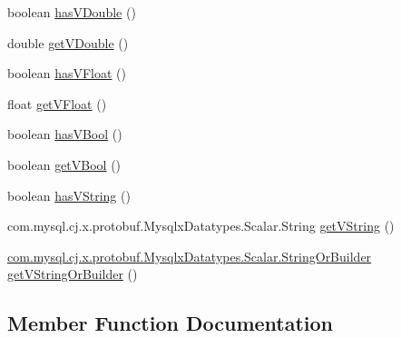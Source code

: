 \begin{DoxyCompactItemize}
\item 
boolean \mbox{\hyperlink{interfacecom_1_1mysql_1_1cj_1_1x_1_1protobuf_1_1_mysqlx_datatypes_1_1_scalar_or_builder_a7bc12f50111b5c67b28bb53db4e1cc15}{has\+V\+Double}} ()
\item 
double \mbox{\hyperlink{interfacecom_1_1mysql_1_1cj_1_1x_1_1protobuf_1_1_mysqlx_datatypes_1_1_scalar_or_builder_abaf6d23ac57106345f809ca86c0ccc55}{get\+V\+Double}} ()
\item 
boolean \mbox{\hyperlink{interfacecom_1_1mysql_1_1cj_1_1x_1_1protobuf_1_1_mysqlx_datatypes_1_1_scalar_or_builder_a95c66f16de5f11832c452efe8162591b}{has\+V\+Float}} ()
\item 
float \mbox{\hyperlink{interfacecom_1_1mysql_1_1cj_1_1x_1_1protobuf_1_1_mysqlx_datatypes_1_1_scalar_or_builder_afa2e969d3b29289e6835794188eb5c87}{get\+V\+Float}} ()
\item 
boolean \mbox{\hyperlink{interfacecom_1_1mysql_1_1cj_1_1x_1_1protobuf_1_1_mysqlx_datatypes_1_1_scalar_or_builder_afb5ea784ea895145c0f698c4d542f2d8}{has\+V\+Bool}} ()
\item 
boolean \mbox{\hyperlink{interfacecom_1_1mysql_1_1cj_1_1x_1_1protobuf_1_1_mysqlx_datatypes_1_1_scalar_or_builder_ae324b8314100f315a7d9f8ee015b33e9}{get\+V\+Bool}} ()
\item 
boolean \mbox{\hyperlink{interfacecom_1_1mysql_1_1cj_1_1x_1_1protobuf_1_1_mysqlx_datatypes_1_1_scalar_or_builder_ade20ebcac279bff8c338d8f0acc8c322}{has\+V\+String}} ()
\item 
com.\+mysql.\+cj.\+x.\+protobuf.\+Mysqlx\+Datatypes.\+Scalar.\+String \mbox{\hyperlink{interfacecom_1_1mysql_1_1cj_1_1x_1_1protobuf_1_1_mysqlx_datatypes_1_1_scalar_or_builder_a01e0e7bbbea2def9a9df26761493a664}{get\+V\+String}} ()
\item 
\mbox{\hyperlink{interfacecom_1_1mysql_1_1cj_1_1x_1_1protobuf_1_1_mysqlx_datatypes_1_1_scalar_1_1_string_or_builder}{com.\+mysql.\+cj.\+x.\+protobuf.\+Mysqlx\+Datatypes.\+Scalar.\+String\+Or\+Builder}} \mbox{\hyperlink{interfacecom_1_1mysql_1_1cj_1_1x_1_1protobuf_1_1_mysqlx_datatypes_1_1_scalar_or_builder_aee97429eb52acda5c5da4b6dbcb9c56a}{get\+V\+String\+Or\+Builder}} ()
\end{DoxyCompactItemize}


\subsection{Member Function Documentation}
\mbox{\label{interfacecom_1_1mysql_1_1cj_1_1x_1_1protobuf_1_1_mysqlx_datatypes_1_1_scalar_or_builder_ae28ed54779317bfc352e581e1457c16e}} 
